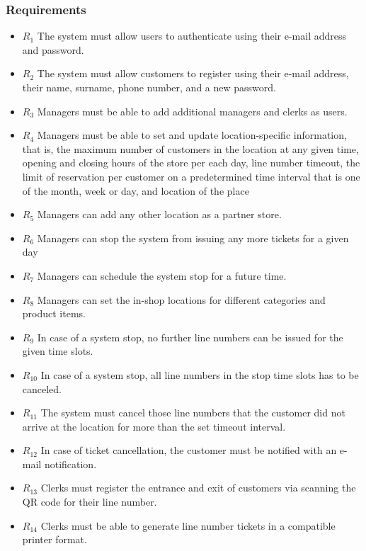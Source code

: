 \subsubsection{Requirements}
\begin{itemize}
    \item \textbf{$R_{1}$} The system must allow users to authenticate using their e-mail address and password.
    \item \textbf{$R_{2}$} The system must allow customers to register using their e-mail address, their name, surname, phone number, and a new password.
    \item \textbf{$R_{3}$} Managers must be able to add additional managers and clerks as users.
    \item \textbf{$R_{4}$} Managers must be able to set and update location-specific information, that is, the maximum number of customers in the location at any given time, opening and closing hours of the store per each day, line number timeout, the limit of reservation per customer on a predetermined time interval that is one of the month, week or day, and location of the place %
    \item \textbf{$R_{5}$} Managers can add any other location as a partner store.
    \item \textbf{$R_{6}$} Managers can stop the system from issuing any more tickets for a given day
    \item \textbf{$R_{7}$} Managers can schedule the system stop for a future time.
    \item \textbf{$R_{8}$} Managers can set the in-shop locations for different categories and product items.
    \item \textbf{$R_{9}$} In case of a system stop, no further line numbers can be issued for the given time slots.
    \item \textbf{$R_{10}$} In case of a system stop, all line numbers in the stop time slots has to be canceled.
    \item \textbf{$R_{11}$} The system must cancel those line numbers that the customer did not arrive at the location for more than the set timeout interval.
    \item \textbf{$R_{12}$} In case of ticket cancellation, the customer must be notified with an e-mail notification.
    \item \textbf{$R_{13}$} Clerks must register the entrance and exit of customers via scanning the QR code for their line number.
    \item \textbf{$R_{14}$} Clerks must be able to generate line number tickets in a compatible printer format.

\end{itemize}
